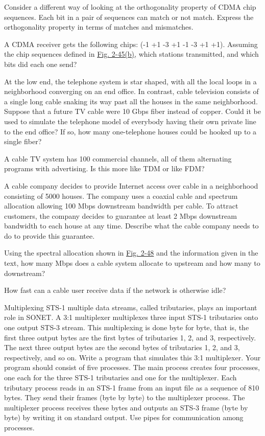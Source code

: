 Consider a different way of looking at the orthogonality property of
CDMA chip sequences. Each bit in a pair of sequences can match or not
match. Express the orthogonality property in terms of matches and
mismatches.

A CDMA receiver gets the following chips: (-1 +1 -3 +1 -1 -3 +1 +1).
Assuming the chip sequences defined in
\protect\hyperlink{0130661023_ch02lev1sec6.htmlux5cux23ch02fig45}{Fig.
2-45(b)}, which stations transmitted, and which bits did each one send?

At the low end, the telephone system is star shaped, with all the local
loops in a neighborhood converging on an end office. In contrast, cable
television consists of a single long cable snaking its way past all the
houses in the same neighborhood. Suppose that a future TV cable were 10
Gbps fiber instead of copper. Could it be used to simulate the telephone
model of everybody having their own private line to the end office? If
so, how many one-telephone houses could be hooked up to a single fiber?

A cable TV system has 100 commercial channels, all of them alternating
programs with advertising. Is this more like TDM or like FDM?

A cable company decides to provide Internet access over cable in a
neighborhood consisting of 5000 houses. The company uses a coaxial cable
and spectrum allocation allowing 100 Mbps downstream bandwidth per
cable. To attract customers, the company decides to guarantee at least 2
Mbps downstream bandwidth to each house at any time. Describe what the
cable company needs to do to provide this guarantee.

Using the spectral allocation shown in
\protect\hyperlink{0130661023_ch02lev1sec7.htmlux5cux23ch02fig48}{Fig.
2-48} and the information given in the text, how many Mbps does a cable
system allocate to upstream and how many to downstream?

How fast can a cable user receive data if the network is otherwise idle?

Multiplexing STS-1 multiple data streams, called tributaries, plays an
important role in SONET. A 3:1 multiplexer multiplexes three input STS-1
tributaries onto one output STS-3 stream. This multiplexing is done byte
for byte, that is, the first three output bytes are the first bytes of
tributaries 1, 2, and 3, respectively. The next three output bytes are
the second bytes of tributaries 1, 2, and 3, respectively, and so on.
Write a program that simulates this 3:1 multiplexer. Your program should
consist of five processes. The main process creates four processes, one
each for the three STS-1 tributaries and one for the multiplexer. Each
tributary process reads in an STS-1 frame from an input file as a
sequence of 810 bytes. They send their frames (byte by byte) to the
multiplexer process. The multiplexer process receives these bytes and
outputs an STS-3 frame (byte by byte) by writing it on standard output.
Use pipes for communication among processes.
